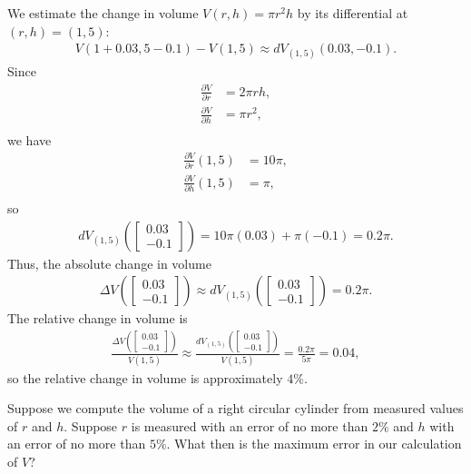 \documentclass[12pt,letterpaper,reqno]{article}
\numberwithin{equation}{section}
\begin{document}
{{\color{red}
\begin{solution}
We estimate the change in volume $V(r,h)=\pi r^2h$ by its differential at $(r,h)=(1,5)$:
\begin{align*}
	V(1+0.03,5-0.1)-V(1,5) \approx dV_{(1,5)}(0.03,-0.1).
\end{align*}
Since
\begin{align*}
	\frac{\partial V}{\partial r}&=2\pi rh, \\
	\frac{\partial V}{\partial h}&=\pi r^2, \\
\end{align*}
we have
\begin{align*}
	\frac{\partial V}{\partial r}(1,5)&=10\pi, \\
	\frac{\partial V}{\partial h}(1,5)&=\pi, \\
\end{align*}	
so
\begin{align*}
	dV_{(1,5)}(\begin{bmatrix}
		0.03 \\ -0.1
	\end{bmatrix})=10\pi(0.03)+\pi(-0.1)=0.2\pi.
\end{align*}
Thus, the absolute change in volume 
\begin{align*}
	\Delta V(\begin{bmatrix}
		0.03 \\ -0.1
	\end{bmatrix}) \approx dV_{(1,5)}(\begin{bmatrix}
		0.03 \\ -0.1
	\end{bmatrix})=0.2\pi.
\end{align*}
The relative change in volume is
\begin{align*}
	\frac{\Delta V(\begin{bmatrix}
		0.03 \\ -0.1
	\end{bmatrix})}{V(1,5)} \approx \frac{dV_{(1,5)}(\begin{bmatrix}
		0.03 \\ -0.1
	\end{bmatrix})}{V(1,5)}=\frac{0.2\pi}{5\pi}=0.04,
\end{align*}
so the relative change in volume is approximately $4\%$.
\end{solution}
}

\begin{example}
	Suppose we compute the volume of a right circular cylinder from measured values of $r$ and $h$. Suppose $r$ is measured with an error of no more than $2\%$ and $h$ with an error of no more than $5\%$.  What then is the maximum error in our calculation of $V$?
	

\end{example}}
\end{document}
